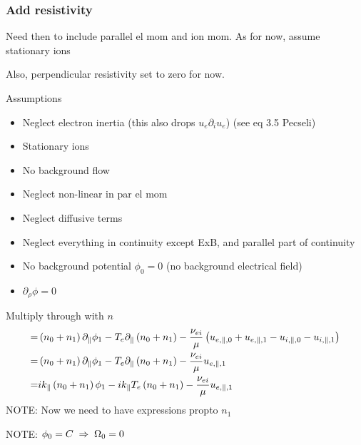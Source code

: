 \subsubsection{Add resistivity}
Need then to include parallel el mom and ion mom. As for now, assume stationary ions

Also, perpendicular resistivity set to zero for now.

Assumptions
%
\begin{itemize}
    \item Neglect electron inertia (this also drops $u_e \partial_i u_e$) (see eq 3.5 Pecseli)
    \item Stationary ions
    \item No background flow
    \item Neglect non-linear in par el mom
    \item Neglect diffusive terms
    \item Neglect everything in continuity except ExB, and parallel part of continuity
    \item No background potential $\phi_0 = 0$ (no background electrical field)
    \item $\partial_\rho\phi = 0$
\end{itemize}
%
Multiply through with $n$
%
\begin{align*}
%
=&
\L( n_0 + n_1\R)\partial_\| \phi_1
-
T_e \partial_\| \L( n_0 + n_1 \R)
  -  \frac{\nu_{ei}}{\mu }
  \L( u_{e,\|,0} + u_{e,\|,1} - u_{i,\|,0} - u_{i,\|,1} \R)
  \\
=&
\L( n_0 + n_1\R)\partial_\| \phi_1
-
T_e \partial_\| \L( n_0 + n_1 \R)
  -  \frac{\nu_{ei}}{\mu } u_{e,\|,1}
  \\
=&
ik_\|\L( n_0 + n_1\R) \phi_1
-
ik_\|T_e \L( n_0 + n_1 \R)
  -  \frac{\nu_{ei}}{\mu }  u_{e,\|,1}
\end{align*}
%
NOTE: Now we need to have expressions propto $n_1$

NOTE: $\phi_0=C \; \Rightarrow \; \Omega_0 = 0$

